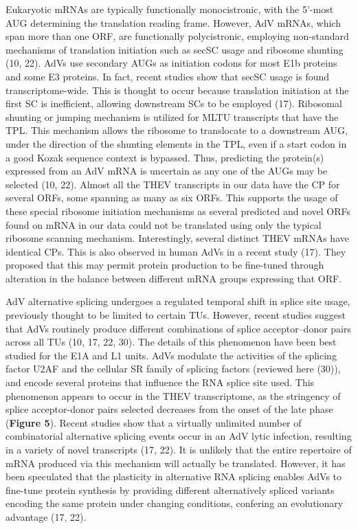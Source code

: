\documentclass[
]{article}
\begin{document}
Eukaryotic mRNAs are typically functionally monocistronic, with the
5'-most AUG determining the translation reading frame. However, AdV
mRNAs, which span more than one ORF, are functionally polycistronic,
employing non-standard mechanisms of translation initiation such as
secSC usage and ribosome shunting (10, 22). AdVs use secondary AUGs as
initiation codons for most E1b proteins and some E3 proteins. In fact,
recent studies show that secSC usage is found transcriptome-wide. This
is thought to occur because translation initiation at the first SC is
inefficient, allowing downstream SCs to be employed (17). Ribosomal
shunting or jumping mechanism is utilized for MLTU transcripts that have
the TPL. This mechanism allows the ribosome to translocate to a
downstream AUG, under the direction of the shunting elements in the TPL,
even if a start codon in a good Kozak sequence context is bypassed.
Thus, predicting the protein(s) expressed from an AdV mRNA is uncertain
as any one of the AUGs may be selected (10, 22). Almost all the THEV
transcripts in our data have the CP for several ORFs, some spanning as
many as six ORFs. This supports the usage of these special ribosome
initiation mechanisms as several predicted and novel ORFs found on mRNA
in our data could not be translated using only the typical ribosome
scanning mechanism. Interestingly, several distinct THEV mRNAs have
identical CPs. This is also observed in human AdVs in a recent study
(17). They proposed that this may permit protein production to be
fine-tuned through alteration in the balance between different mRNA
groups expressing that ORF.

AdV alternative splicing undergoes a regulated temporal shift in splice
site usage, previously thought to be limited to certain TUs. However,
recent studies suggest that AdVs routinely produce different
combinations of splice acceptor--donor pairs across all TUs (10, 17, 22,
30). The details of this phenomenon have been best studied for the E1A
and L1 units. AdVs modulate the activities of the splicing factor U2AF
and the cellular SR family of splicing factors (reviewed here (30)), and
encode several proteins that influence the RNA splice site used. This
phenomenon appears to occur in the THEV transcriptome, as the stringency
of splice acceptor-donor pairs selected decreases from the onset of the
late phase (\textbf{Figure 5}). Recent studies show that a virtually
unlimited number of combinatorial alternative splicing events occur in
an AdV lytic infection, resulting in a variety of novel transcripts (17,
22). It is unlikely that the entire repertoire of mRNA produced via this
mechanism will actually be translated. However, it has been speculated
that the plasticity in alternative RNA splicing enables AdVs to
fine-tune protein synthesis by providing different alternatively spliced
variants encoding the same protein under changing conditions, confering
an evolutionary advantage (17, 22).
\end{document}
